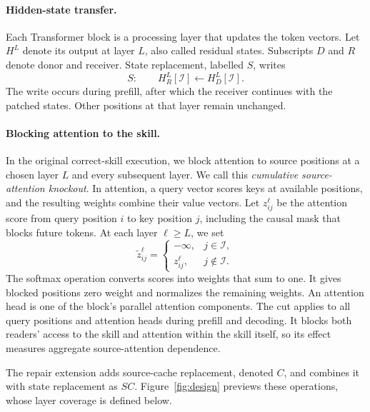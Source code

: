 \paragraph{Hidden-state transfer.}
Each Transformer block is a processing layer that updates the token
vectors. Let $H^L$ denote its output at layer $L$, also called residual
states. Subscripts $D$ and $R$ denote donor and receiver.
State replacement, labelled $S$, writes
\begin{equation}
S:\qquad H_R^L[\mathcal I]\leftarrow H_D^L[\mathcal I].
\label{eq:inject}
\end{equation}
The write occurs during prefill, after which the receiver continues with
the patched states. Other positions at that layer remain unchanged.

\paragraph{Blocking attention to the skill.}
In the original correct-skill execution, we block attention to source
positions at a chosen layer $L$ and every subsequent layer. We call this
\emph{cumulative source-attention knockout}. In attention, a query vector
scores keys at available positions, and the resulting weights combine
their value vectors. Let $z^\ell_{ij}$ be the
attention score from query position $i$ to key position $j$, including the
causal mask that blocks future tokens. At each layer $\ell\ge L$, we set
\begin{equation}
\widetilde z^\ell_{ij}=
\begin{cases}
-\infty,&j\in\mathcal I,\\
z^\ell_{ij},&j\notin\mathcal I.
\end{cases}
\label{eq:knockout}
\end{equation}
The softmax operation converts scores into weights that sum to one.
It gives blocked positions zero weight and normalizes the remaining
weights. An attention head is one of the block's parallel attention
components. The cut applies to all query positions and attention heads during
prefill and decoding. It blocks both readers' access to the skill and
attention within the skill itself, so its effect measures aggregate
source-attention dependence.

The repair extension adds source-cache replacement, denoted $C$, and
combines it with state replacement as $SC$. Figure~\ref{fig:design}
previews these operations, whose layer coverage is defined below.



